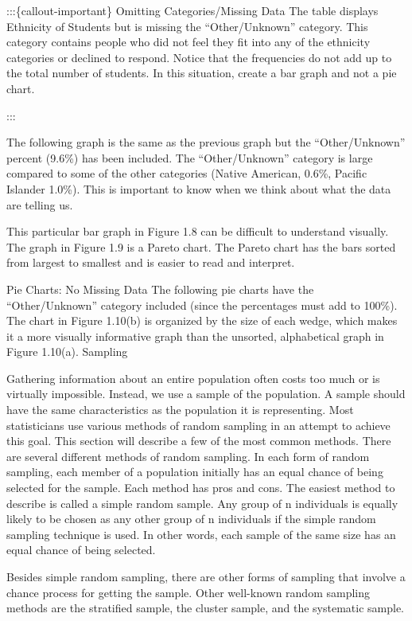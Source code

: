 \documentclass[
  letterpaper,
  DIV=11,
  numbers=noendperiod]{scrreprt}
\begin{document}
:::\{callout-important\} Omitting Categories/Missing Data The table
displays Ethnicity of Students but is missing the ``Other/Unknown''
category. This category contains people who did not feel they fit into
any of the ethnicity categories or declined to respond. Notice that the
frequencies do not add up to the total number of students. In this
situation, create a bar graph and not a pie chart.

:::

The following graph is the same as the previous graph but the
``Other/Unknown'' percent (9.6\%) has been included. The
``Other/Unknown'' category is large compared to some of the other
categories (Native American, 0.6\%, Pacific Islander 1.0\%). This is
important to know when we think about what the data are telling us.

This particular bar graph in Figure 1.8 can be difficult to understand
visually. The graph in Figure 1.9 is a Pareto chart. The Pareto chart
has the bars sorted from largest to smallest and is easier to read and
interpret.

Pie Charts: No Missing Data The following pie charts have the
``Other/Unknown'' category included (since the percentages must add to
100\%). The chart in Figure 1.10(b) is organized by the size of each
wedge, which makes it a more visually informative graph than the
unsorted, alphabetical graph in Figure 1.10(a). Sampling

Gathering information about an entire population often costs too much or
is virtually impossible. Instead, we use a sample of the population. A
sample should have the same characteristics as the population it is
representing. Most statisticians use various methods of random sampling
in an attempt to achieve this goal. This section will describe a few of
the most common methods. There are several different methods of random
sampling. In each form of random sampling, each member of a population
initially has an equal chance of being selected for the sample. Each
method has pros and cons. The easiest method to describe is called a
simple random sample. Any group of n individuals is equally likely to be
chosen as any other group of n individuals if the simple random sampling
technique is used. In other words, each sample of the same size has an
equal chance of being selected.

Besides simple random sampling, there are other forms of sampling that
involve a chance process for getting the sample. Other well-known random
sampling methods are the stratified sample, the cluster sample, and the
systematic sample.
\end{document}
